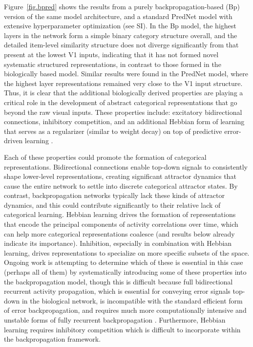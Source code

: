 \documentclass[11pt,twoside]{article}
\newif\myifpdf
\begin{document}
Figure~\ref{fig.bpred} shows the results from a purely backpropagation-based (Bp) version of the same model architecture, and a standard PredNet model \cite{LotterKreimanCox16} with extensive hyperparameter optimization (see SI).  In the Bp model, the highest layers in the network form a simple binary category structure overall, and the detailed item-level similarity structure does not diverge significantly from that present at the lowest V1 inputs, indicating that it has not formed novel systematic structured representations, in contrast to those formed in the biologically based model.  Similar results were found in the PredNet model, where the highest layer representations remained very close to the V1 input structure.  Thus, it is clear that the additional biologically derived properties are playing a critical role in the development of abstract categorical representations that go beyond the raw visual inputs. These properties include: excitatory bidirectional connections, inhibitory competition, and an additional Hebbian form of learning that serves as a regularizer (similar to weight decay) on top of predictive error-driven learning \cite{OReilly98,OReillyMunakata00}.

Each of these properties could promote the formation of categorical representations. Bidirectional connections enable top-down signals to consistently shape lower-level representations, creating significant attractor dynamics that cause the entire network to settle into discrete categorical attractor states. By contrast, backpropagation networks typically lack these kinds of attractor dynamics, and this could contribute significantly to their relative lack of categorical learning.  Hebbian learning drives the formation of representations that encode the principal components of activity correlations over time, which can help more categorical representations coalesce (and results below already indicate its importance).  Inhibition, especially in combination with Hebbian learning, drives representations to specialize on more specific subsets of the space.  Ongoing work is attempting to determine which of these is essential in this case (perhaps all of them) by systematically introducing some of these properties into the backpropagation model, though this is difficult because full bidirectional recurrent activity propagation, which is essential for conveying error signals top-down in the biological network, is incompatible with the standard efficient form of error backpropagation, and requires much more computationally intensive and unstable forms of fully recurrent backpropagation \cite{WilliamsZipser92,Pineda87}.  Furthermore, Hebbian learning requires inhibitory competition which is difficult to incorporate within the backpropagation framework.
\end{document}
